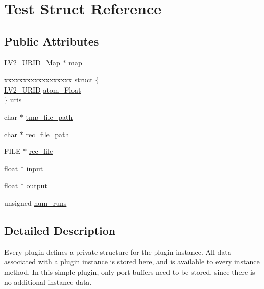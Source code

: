\hypertarget{struct_test}{}\section{Test Struct Reference}
\label{struct_test}
\subsection*{Public Attributes}
\begin{DoxyCompactItemize}
\item 
\hyperlink{urid_8h_afefb42cd271f750506a8739f73c098c5}{L\+V2\+\_\+\+U\+R\+I\+D\+\_\+\+Map} $\ast$ \hyperlink{struct_test_ad05518bffce657f39ce4b74577ea0db5}{map}
\item 
\begin{tabbing}
xx\=xx\=xx\=xx\=xx\=xx\=xx\=xx\=xx\=\kill
struct \{\\
\>\hyperlink{urid_8h_a5ff0630d245539e9f6dca10ff3c40fae}{LV2\_URID} \hyperlink{struct_test_ac909fa1372a76c60714f9767172cd63e}{atom\_Float}\\
\} \hyperlink{struct_test_af9349b24b598191afc7ebe18298f6a90}{uris}\\

\end{tabbing}\item 
char $\ast$ \hyperlink{struct_test_a9000ddac38f1cb743bf56dddb346e907}{tmp\+\_\+file\+\_\+path}
\item 
char $\ast$ \hyperlink{struct_test_a9e3b8c65f5a633a2b8062f1cd9aba8a8}{rec\+\_\+file\+\_\+path}
\item 
F\+I\+LE $\ast$ \hyperlink{struct_test_ad90de8c0e4d29a47e48d9632f4a7fc0a}{rec\+\_\+file}
\item 
float $\ast$ \hyperlink{struct_test_aca605d7ff8d02ca913510079bce17e5b}{input}
\item 
float $\ast$ \hyperlink{struct_test_ae1c066e332063a17a647b1c674f78c4b}{output}
\item 
unsigned \hyperlink{struct_test_aff8d3029e4300e68019b632bc3581d75}{num\+\_\+runs}
\end{DoxyCompactItemize}


\subsection{Detailed Description}
Every plugin defines a private structure for the plugin instance. All data associated with a plugin instance is stored here, and is available to every instance method. In this simple plugin, only port buffers need to be stored, since there is no additional instance data. 

